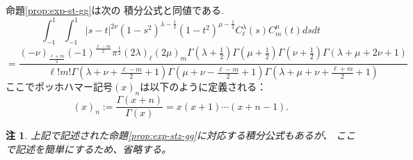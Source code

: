 \documentclass[12pt]{article} %
\newtheorem*{remark*}{\textbf{注}}
\theoremstyle{remark}
\newenvironment{taggedprop}[1]
 {\renewcommand\thetaggedpropx{#1}\taggedpropx}
  {\endtaggedpropx}
\begin{document}
	命題\ref{prop:exp-st-gg}は次の
	積分公式と同値である.
	\begin{taggedprop}{$\;\mathbf{1'}$}
		\label{prop:int-st-gg}
		\begin{equation*}
			\int_{- 1}^1 \int_{- 1}^1 | s - t |^{2 \nu} (1 - s^2)^{\lambda - \frac{1}{2}}
			(1 - t^2)^{\mu - \frac{1}{2}} C_\ell^{\lambda} (s) C_m^{\mu} (t) d s d t
		\end{equation*}
		{
		\begin{equation}
			=\frac{(- \nu)_{\frac{\ell + m}{2}} (- 1)^{\frac{\ell - m}{2}} \pi^{\frac{1}{2}} (2
			\lambda)_\ell (2 \mu)_m \Gamma \left( \lambda + \frac{1}{2} \right) \Gamma \left(
			\mu + \frac{1}{2} \right) \Gamma \left( \nu + \frac{1}{2} \right) \Gamma
		(\lambda + \mu + 2 \nu + 1)}{\ell!m! \Gamma \left( \lambda + \nu + \frac{\ell -
		m}{2} + 1 \right) \Gamma \left( \mu + \nu - \frac{\ell - m}{2} + 1 \right) \Gamma
		\left( \lambda + \mu + \nu + \frac{\ell + m}{2} + 1 \right)}
			\label{eqn:int-st-gg}
			\tag{1$'$}
		\end{equation}
		}
	\end{taggedprop}
	ここでポッホハマー記号$(x)_n$は以下のように定義される：\begin{equation*}
		(x)_n:=\frac{\Gamma(x+n)}{\Gamma(x)}=x(x+1)\cdots(x+n-1).
	\end{equation*}
	\begin{remark*}
		上記で記述された命題\ref{prop:exp-stz-gg}に対応する積分公式もあるが、
		ここで記述を簡単にするため、省略する。
	\end{remark*}
\end{document}
